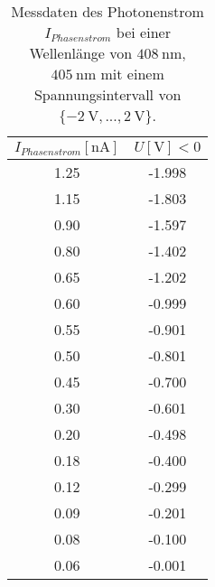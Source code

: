 \begin{table}
    \centering
    \caption{Messdaten des Photonenstrom $I_{Phasenstrom}$ bei einer Wellenlänge von $\SI{408}{\nano\meter}$, $\SI{405}{\nano\meter}$ mit einem Spannungsintervall von $\{\SI{-2}{\volt},... ,\SI{2}{\volt}\}$.}
    \label{tab:tab4}
    \begin{tabular}{c c}
        \toprule
        $I_{Phasenstrom}[\si{\nano\ampere}]$ & $U [\si{\volt}] < 0$ \\
        \midrule
1.25        &        -1.998   \\       
1.15        &        -1.803   \\
0.90        &        -1.597   \\
0.80        &        -1.402   \\
0.65        &        -1.202   \\
0.60        &        -0.999   \\
0.55        &        -0.901   \\
0.50        &        -0.801   \\
0.45        &        -0.700   \\
0.30        &        -0.601   \\
0.20        &        -0.498   \\
0.18        &        -0.400   \\
0.12        &        -0.299   \\       
0.09        &        -0.201   \\
0.08        &        -0.100   \\
0.06        &        -0.001   \\    

       \bottomrule
    \end{tabular}
\end{table}